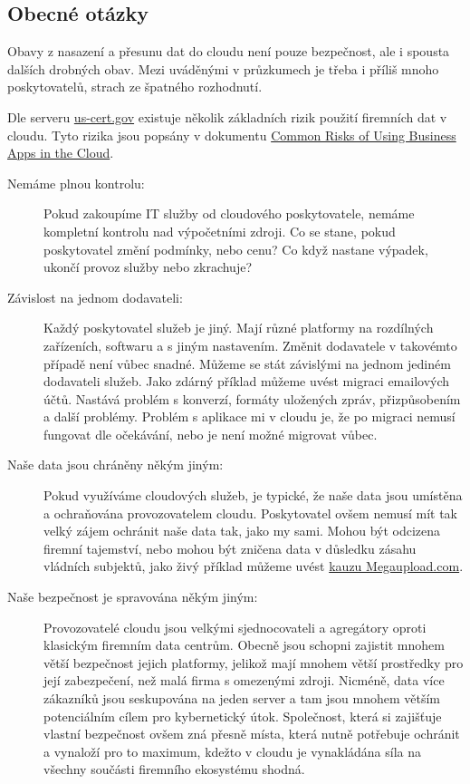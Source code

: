 \subsection{Obecné otázky}
Obavy z nasazení a přesunu dat do cloudu není pouze bezpečnost, ale i spousta dalších drobných obav. Mezi uváděnými v průzkumech je třeba i příliš mnoho poskytovatelů, strach ze špatného rozhodnutí.\cite{businessworld:prvniKroky}

Dle serveru \href{http://www.us-cert.gov/security-publications/Common-Risks-Using-Business-Apps-Cloud}{us-cert.gov} existuje několik základních rizik použití firemních dat v cloudu. Tyto rizika jsou popsány v dokumentu \href{http://www.us-cert.gov/sites/default/files/publications/using-cloud-apps-for-business.pdf}{Common Risks of Using Business Apps in the Cloud}\cite{uscert:risks}.
\begin{description}
	\item[Nemáme plnou kontrolu:] Pokud zakoupíme IT služby od cloudového poskytovatele, nemáme kompletní kontrolu nad výpočetními zdroji. Co se stane, pokud poskytovatel změní podmínky, nebo cenu? Co když nastane výpadek, ukončí provoz služby nebo zkrachuje?
	\item[Závislost na jednom dodavateli:] Každý poskytovatel služeb je jiný. Mají různé platformy na rozdílných zařízeních, softwaru a s jiným nastavením. Změnit dodavatele v takovémto případě není vůbec snadné. Můžeme se stát závislými na jednom jediném dodavateli služeb. Jako zdárný příklad můžeme uvést migraci emailových účtů. Nastává problém s konverzí, formáty uložených zpráv, přizpůsobením a další problémy.
	Problém s aplikace mi v cloudu je, že po migraci nemusí fungovat dle očekávání, nebo je není možné migrovat vůbec.
	\item[Naše data jsou chráněny někým jiným:] Pokud využíváme cloudových služeb, je typické, že naše data jsou umístěna a ochraňována provozovatelem cloudu. Poskytovatel ovšem nemusí mít tak velký zájem ochránit naše data tak, jako my sami.
	Mohou být odcizena firemní tajemství, nebo mohou být zničena data v důsledku zásahu vládních subjektů, jako živý příklad můžeme uvést \href{http://www.zive.cz/bleskovky/megaupload-zastaven-sefove-zatceni/sc-4-a-162004/default.aspx}{kauzu Megaupload.com}\cite{zive:megaupload}.
	\item[Naše bezpečnost je spravována někým jiným:] Provozovatelé cloudu jsou velkými sjednocovateli a agregátory oproti klasickým firemním data centrům. Obecně jsou schopni zajistit mnohem větší bezpečnost jejich platformy, jelikož mají mnohem větší prostředky pro její zabezpečení, než malá firma s omezenými zdroji.
	Nicméně, data více zákazníků jsou seskupována na jeden server a tam jsou mnohem větším potenciálním cílem pro kybernetický útok. Společnost, která si zajišťuje vlastní bezpečnost ovšem zná přesně místa, která nutně potřebuje ochránit a vynaloží pro to maximum, kdežto v cloudu je vynakládána síla na všechny součásti firemního ekosystému shodná.
\end{description}

